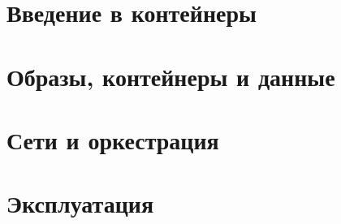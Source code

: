 \documentclass[11pt,a4paper,oneside]{book}
\begin{document}


\frontmatter
\tableofcontents


\mainmatter

\part{Введение в контейнеры}




\part{Образы, контейнеры и данные}





\part{Сети и оркестрация}



\part{Эксплуатация}




\end{document}
